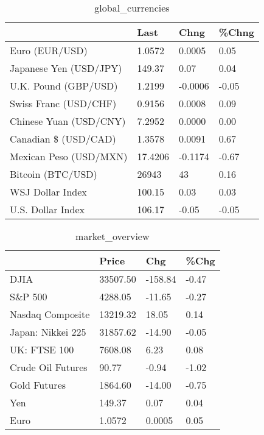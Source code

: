 \documentclass{article}%
\begin{document}
%


\begin{table}[htbp]%
\caption{global\_currencies}%
\centering%
\begin{adjustbox}{width=1\textwidth}%
\begin{tabular}{llll}
\toprule
                       &    Last &    Chng & \%Chng \\
\midrule
        Euro (EUR/USD) &  1.0572 &  0.0005 &  0.05 \\
Japanese Yen (USD/JPY) &  149.37 &    0.07 &  0.04 \\
  U.K. Pound (GBP/USD) &  1.2199 & -0.0006 & -0.05 \\
 Swiss Franc (USD/CHF) &  0.9156 &  0.0008 &  0.09 \\
Chinese Yuan (USD/CNY) &  7.2952 &  0.0000 &  0.00 \\
  Canadian \$ (USD/CAD) &  1.3578 &  0.0091 &  0.67 \\
Mexican Peso (USD/MXN) & 17.4206 & -0.1174 & -0.67 \\
     Bitcoin (BTC/USD) &   26943 &      43 &  0.16 \\
      WSJ Dollar Index &  100.15 &    0.03 &  0.03 \\
     U.S. Dollar Index &  106.17 &   -0.05 & -0.05 \\
\bottomrule
\end{tabular}
%
\end{adjustbox}%
\end{table}

%


\begin{table}[htbp]%
\caption{market\_overview}%
\centering%
\begin{adjustbox}{width=1\textwidth}%
\begin{tabular}{llll}
\toprule
                  &    Price &     Chg &  \%Chg \\
\midrule
             DJIA & 33507.50 & -158.84 & -0.47 \\
          S\&P 500 &  4288.05 &  -11.65 & -0.27 \\
 Nasdaq Composite & 13219.32 &   18.05 &  0.14 \\
Japan: Nikkei 225 & 31857.62 &  -14.90 & -0.05 \\
     UK: FTSE 100 &  7608.08 &    6.23 &  0.08 \\
Crude Oil Futures &    90.77 &   -0.94 & -1.02 \\
     Gold Futures &  1864.60 &  -14.00 & -0.75 \\
              Yen &   149.37 &    0.07 &  0.04 \\
             Euro &   1.0572 &  0.0005 &  0.05 \\
\bottomrule
\end{tabular}
%
\end{adjustbox}%
\end{table}

%
\end{document}
